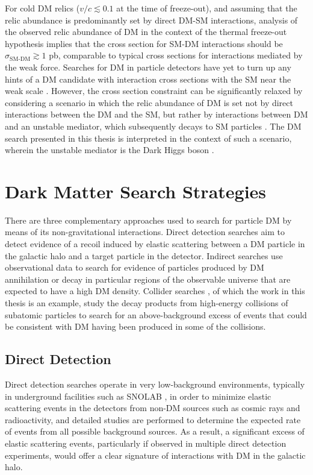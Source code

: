 For cold DM relics (\(v/c\lesssim0.1\) at the time of freeze-out), and assuming that the relic abundance is predominantly set by direct DM-SM interactions, analysis of the observed relic abundance of DM in the context of the thermal freeze-out hypothesis \cite{dm_xsec_2015} implies that the cross section for SM-DM interactions should be \(\sigma_\text{SM-DM}\gtrsim1\) pb, comparable to typical cross sections for interactions mediated by the weak force. Searches for DM in particle detectors have yet to turn up any hints of a DM candidate with interaction cross sections with the SM near the weak scale \cite{wimp_searches_2018}. However, the cross section constraint can be significantly relaxed by considering a scenario in which the relic abundance of DM is set not by direct interactions between the DM and the SM, but rather by interactions between DM and an unstable mediator, which subsequently decays to SM particles \cite{secluded_dm_2008}. The DM search presented in this thesis is interpreted in the context of such a scenario, wherein the unstable mediator is the Dark Higgs boson \cite{Duerr_2016,Duerr2017}.

\section{Dark Matter Search Strategies}

There are three complementary approaches used to search for particle DM by means of its non-gravitational interactions. Direct detection searches \cite{billard2021direct} aim to detect evidence of a recoil induced by elastic scattering between a DM particle in the galactic halo and a target particle in the detector. Indirect searches \cite{CIRELLI_2012, conrad} use observational data to search for evidence of particles produced by DM annihilation or decay in particular regions of the observable universe that are expected to have a high DM density. Collider searches \cite{DM_colliders}, of which the work in this thesis is an example, study the decay products from high-energy collisions of subatomic particles to search for an above-background excess of events that could be consistent with DM having been produced in some of the collisions.

\subsection{Direct Detection}

Direct detection searches operate in very low-background environments, typically in underground facilities such as SNOLAB \cite{Lawson_2020}, in order to minimize elastic scattering events in the detectors from non-DM sources such as cosmic rays and radioactivity, and detailed studies are performed to determine the expected rate of events from all possible background sources. As a result, a significant excess of elastic scattering events, particularly if observed in multiple direct detection experiments, would offer a clear signature of interactions with DM in the galactic halo. 

